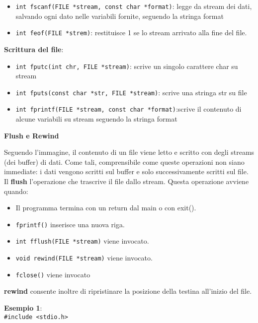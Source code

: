 \begin{flushleft}
\begin{itemize}
\begin{itemize}
            \item \texttt{int fscanf(FILE *stream, const char *format)}: legge da stream dei dati, salvando 
                    ogni dato nelle variabili fornite, seguendo la stringa format 
            \item \texttt{int feof(FILE *strem)}: restituisce 1 se lo stream \ace arrivato alla fine del file.
          \end{itemize}
          \textbf{Scrittura del file}:
          \begin{itemize}
            \item \texttt{int fputc(int chr, FILE *stream)}: scrive un singolo carattere char  su stream 
            \item \texttt{int fputs(const char *str, FILE *stream)}: scrive una stringa str su file 
            \item \texttt{int fprintf(FILE *stream, const char *format)}:scrive il contenuto di alcune variabili su stream 
                    seguendo la stringa format
          \end{itemize}
          \textbf{Flush e Rewind} \par 
          Seguendo l'immagine, il contenuto di un file viene letto e scritto con degli streams 
          (dei buffer) di dati. Come tali, \ace comprensibile come queste operazioni non siano 
          immediate: i dati vengono scritti sul buffer e solo successivamente scritti sul file. Il 
          \textbf{flush} \ace l'operazione che trascrive il file dallo stream. Questa operazione avviene 
          quando: 
          \begin{itemize}
            \item Il programma termina con un return dal main o con exit().
            \item \texttt{fprintf()} inserisce una nuova riga.
            \item \texttt{int fflush(FILE *stream)} viene invocato.
            \item \texttt{void rewind(FILE *stream)} viene invocato.
            \item \texttt{fclose()} viene invocato
          \end{itemize}
          \textbf{rewind} consente inoltre di ripristinare la posizione della testina all'inizio del file. \\
          \begin{flushleft}
            \textbf{Esempio 1}:\\
            \texttt{\#include <stdio.h>\\
}
\end{flushleft}
\end{itemize}
\end{flushleft}
